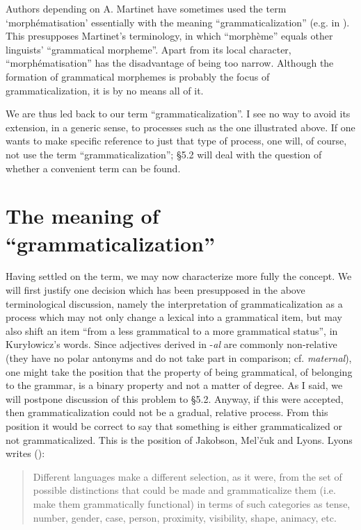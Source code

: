 Authors depending on A. Martinet have sometimes used the term ‘morphématisation’ essentially with the meaning ``grammaticalization'' (e.g. in \citet[1064f]{Martinet1968}). This presupposes Martinet's terminology, in which ``morphème'' equals other linguists' ``grammatical morpheme''. Apart from its local character, ``morphématisation'' has the disadvantage of being too narrow. Although the formation of grammatical morphemes is probably the focus of grammaticalization, it is by no means all of it.

We are thus led back to our term ``grammaticalization''. I see no way to avoid its extension, in a generic sense, to processes such as the one illustrated above. If one wants to make specific reference to just that type of process, one will, of course, not use the term ``grammaticalization''; §5.2 will deal with the question of whether a convenient term can be found.

\section{The meaning of ``grammaticalization''} \label{sec:2.2}

Having settled on the term, we may now characterize more fully the concept. We will first justify one decision which has been presupposed in the above terminological discussion, namely the interpretation of grammaticalization as a process which may not only change a lexical into a grammatical item, but may also shift an item “from a less grammatical to a more grammatical status”, in Kuryłowicz's words. Since adjectives derived in -\textit{al} are commonly non-relative (they have no polar antonyms and do not take part in comparison; cf. \textit{maternal}), one might take the position that the property of being grammatical, of belonging to the grammar, is a binary property and not a matter of degree. As I said, we will postpone discussion of this problem to §5.2. Anyway, if this were accepted, then grammaticalization could not be a gradual, relative process. From this position it would be correct to say that something is either grammaticalized or not grammaticalized. This is the position of Jakobson, Mel'čuk and Lyons. Lyons writes (\citeyear[234]{Lyons1977}):

\begin{quote}
Different languages make a different selection, as it were, from the set of possible distinctions that could be made and grammaticalize them (i.e. make them grammatically functional) in terms of such categories as tense, number, gender, case, person, proximity, visibility, shape, animacy, etc.
\end{quote}

